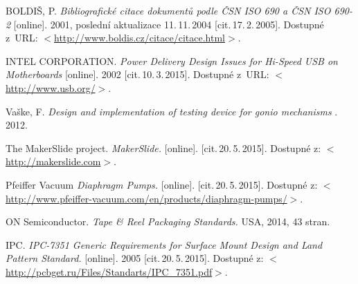 \begin{literatura}{99}
	
    BOLDIŠ, P.
    \emph{Bibliografické citace dokumentů podle ČSN ISO 690 a ČSN ISO 690-2}\/ [online].
    2001, poslední aktualizace 11.\,11.\,2004 [cit.\,17.\,2.\,2005].
    Dostupné z~URL:
    \(<\)\url{http://www.boldis.cz/citace/citace.html}\(>\).
	

    INTEL CORPORATION.
    \emph{Power Delivery Design Issues for Hi-Speed USB on Motherboards}\/ [online].
    2002 [cit.\,10.\,3.\,2015].
    Dostupné z~URL:
    \(<\)\url{http://www.usb.org/}\(>\).

    Vaške, F.
    \emph{Design and implementation of testing device for gonio mechanisms}\/ .
    2012.

    The MakerSlide project.
    \emph{MakerSlide.}\/ [online].
    [cit.\,20.\,5.\,2015].
    Dostupné z:
    \(<\)\url{http://makerslide.com}\(>\).

    Pfeiffer Vacuum
    \emph{Diaphragm Pumps.}\/ [online].
    [cit.\,20.\,5.\,2015].
    Dostupné z:
    \(<\)\url{http://www.pfeiffer-vacuum.com/en/products/diaphragm-pumps/}\(>\).


    ON Semiconductor.
    \emph{Tape \& Reel Packaging Standards.} USA,
    2014, 43 stran.

    IPC.
    \emph{IPC-7351 Generic Requirements for Surface Mount Design and Land Pattern Standard.}\/ [online]. 2005
    [cit.\,20.\,5.\,2015].
    Dostupné z:
    \(<\)\url{http://pcbget.ru/Files/Standarts/IPC_7351.pdf}\(>\).



\end{literatura}
